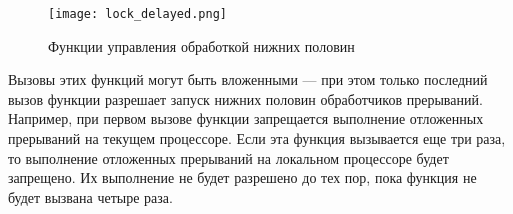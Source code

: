 \begin{figure}[h]
\texttt{[image: lock\_delayed.png]}
\caption{Функции управления обработкой нижних половин}
\end{figure}

Вызовы этих функций могут быть вложенными — при этом только последний вызов функции  разрешает запуск нижних половин обработчиков прерываний. Например, при первом вызове функции  запрещается выполнение отложенных прерываний на текущем процессоре. Если эта функция вызывается еще три раза, то выполнение отложенных прерываний на локальном процессоре будет запрещено. Их выполнение не будет разрешено до тех пор, пока функция  не будет вызвана четыре раза.